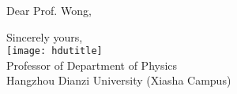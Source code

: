 \documentclass[mode = stationery]{hduthesis}
\begin{document}
\maketitle

Dear Prof. Wong,

\lipsum[1-2]

\vfill \raggedleft

Sincerely yours,\\[4ex]
\texttt{[image: hdutitle]}\\[2ex]
Professor of Department of Physics\\
Hangzhou Dianzi University (Xiasha Campus)

\vspace{\baselineskip}

\clearpage

\notelines[25]
\end{document}
